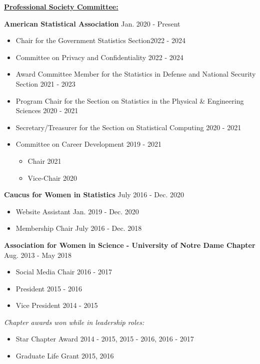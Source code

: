 \documentclass[11pt, letterpaper, roman]{moderncv} %
\newcommand{\leadershipspace}{\vspace{4pt}}
\begin{document}
\vspace{12pt}
\underline{\textbf{\large Professional Society Committee:}}\normalsize

\textbf{American Statistical Association} \hfill Jan. 2020 - Present
    \begin{itemize}
        \item Chair for the Government Statistics Section\hfill 2022 - 2024
        \item Committee on Privacy and Confidentiality \hfill 2022 - 2024
        \item Award Committee Member for the Statistics in Defense and National Security Section \hfill 2021 - 2023
        \item Program Chair for the Section on Statistics in the Physical \& Engineering Sciences \hfill 2020 - 2021
        \item Secretary/Treasurer for the Section on Statistical Computing \hfill 2020 - 2021
        \item Committee on Career Development \hfill 2019 - 2021
        \begin{itemize}
            \item Chair \hfill 2021
            \item Vice-Chair \hfill 2020
        \end{itemize}
    \end{itemize}
    
\leadershipspace
\textbf{Caucus for Women in Statistics} \hfill July 2016 - Dec. 2020
\begin{itemize}
    \item Website Assistant \hfill Jan. 2019 - Dec. 2020
    \item Membership Chair \hfill July 2016 - Dec. 2018
\end{itemize}

\leadershipspace
\textbf{Association for Women in Science - University of Notre Dame Chapter} \hfill Aug. 2013 - May 2018
\begin{itemize}
    \item Social Media Chair \hfill 2016 - 2017
    \item President \hfill 2015 - 2016
    \item Vice President \hfill 2014 - 2015
\end{itemize}
\textit{Chapter awards won while in leadership roles:}
\begin{itemize}
    \item Star Chapter Award \hfill 2014 - 2015, 2015 - 2016, 2016 - 2017
    \item Graduate Life Grant \hfill 2015, 2016
\end{itemize}
\end{document}
